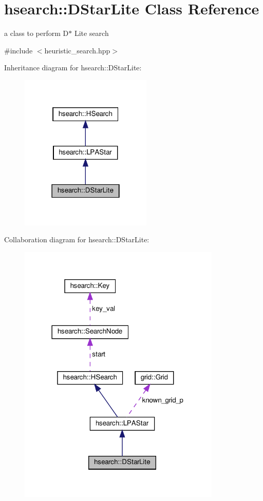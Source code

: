 \hypertarget{classhsearch_1_1DStarLite}{}\section{hsearch\+:\+:D\+Star\+Lite Class Reference}
\label{classhsearch_1_1DStarLite}


a class to perform D$\ast$ Lite search  




{\ttfamily \#include $<$heuristic\+\_\+search.\+hpp$>$}



Inheritance diagram for hsearch\+:\+:D\+Star\+Lite\+:\nopagebreak
\begin{figure}[H]
\begin{center}
\leavevmode
\includegraphics[width=178pt]{d1/d7e/classhsearch_1_1DStarLite__inherit__graph}
\end{center}
\end{figure}


Collaboration diagram for hsearch\+:\+:D\+Star\+Lite\+:\nopagebreak
\begin{figure}[H]
\begin{center}
\leavevmode
\includegraphics[width=273pt]{d4/d60/classhsearch_1_1DStarLite__coll__graph}
\end{center}
\end{figure}
